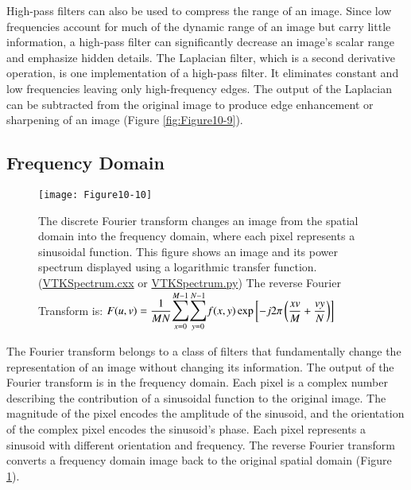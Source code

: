 High-pass filters can also be used to compress the range of an image. Since low frequencies account for much of the dynamic range of an image but carry little information, a high-pass filter can significantly decrease an image's scalar range and emphasize hidden details. The Laplacian filter, which is a second derivative operation, is one implementation of a high-pass filter. It eliminates constant and low frequencies leaving only high-frequency edges. The output of the Laplacian can be subtracted from the original image to produce edge enhancement or sharpening of an image (Figure \ref{fig:Figure10-9}).

\subsection{Frequency Domain}

\begin{figure}[!htb]
	\centering
	\texttt{[image: Figure10-10]}
	\caption{The discrete Fourier transform changes an image from the spatial domain into the frequency domain, where each pixel represents a sinusoidal function. This figure shows an image and its power spectrum displayed using a logarithmic transfer function. (\href{https://lorensen.github.io/VTKExamples/site/Cxx/ImageProcessing/VTKSpectrum/}{VTKSpectrum.cxx} or \href{https://lorensen.github.io/VTKExamples/site/Python/ImageProcessing/VTKSpectrum/}{VTKSpectrum.py}) The reverse Fourier Transform is: $F(u,v) = \dfrac{1}{M N}\mathlarger{\mathlarger{\sum}}_{x = 0}^{M - 1}\mathlarger{\mathlarger{\sum}}_{y = 0}^{N - 1}f(x,y)\exp \left[-j 2 \pi \left( \dfrac{x v}{M}  + \dfrac{v y}{N}\right) \right]$}
	\label{fig:Figure10-10}
\end{figure}

The Fourier transform belongs to a class of filters that fundamentally change the representation of an image without changing its information. The output of the Fourier transform is in the frequency domain. Each pixel is a complex number describing the contribution of a sinusoidal function to the original image. The magnitude of the pixel encodes the amplitude of the sinusoid, and the orientation of the complex pixel encodes the sinusoid's phase. Each pixel represents a sinusoid with different orientation and frequency. The reverse Fourier transform converts a frequency domain image back to the original spatial domain (Figure \ref{fig:Figure10-10}).

